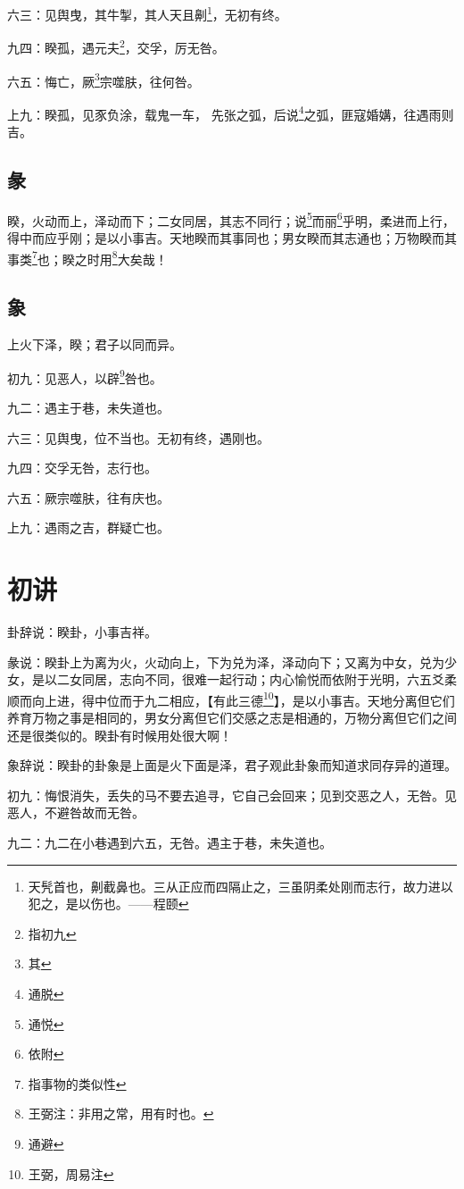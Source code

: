 \documentclass[12pt,oneside]{book}
\begin{document}
六三：见舆曳，其牛掣，其人天且劓\footnote{天髠首也，劓截鼻也。三从正应而四隔止之，三虽阴柔处刚而志行，故力进以犯之，是以伤也。——程颐}，无初有终。

九四：睽孤，遇元夫\footnote{指初九}，交孚，厉无咎。

六五：悔亡，厥\footnote{其}宗噬肤，往何咎。

上九：睽孤，见豕负涂，载鬼一车， 先张之弧，后说\footnote{通脱}之弧，匪寇婚媾，往遇雨则吉。

\subsection{彖}
睽，火动而上，泽动而下；二女同居，其志不同行；说\footnote{通悦}而丽\footnote{依附}乎明，柔进而上行，得中而应乎刚；是以小事吉。天地睽而其事同也；男女睽而其志通也；万物睽而其事类\footnote{指事物的类似性}也；睽之时用\footnote{王弼注：非用之常，用有时也。}大矣哉！

\subsection{象}
上火下泽，睽；君子以同而异。

初九：见恶人，以辟\footnote{通避}咎也。

九二：遇主于巷，未失道也。

六三：见舆曳，位不当也。无初有终，遇刚也。

九四：交孚无咎，志行也。

六五：厥宗噬肤，往有庆也。

上九：遇雨之吉，群疑亡也。

\section{初讲}
卦辞说：睽卦，小事吉祥。

彖说：睽卦上为离为火，火动向上，下为兑为泽，泽动向下；又离为中女，兑为少女，是以二女同居，志向不同，很难一起行动；内心愉悦而依附于光明，六五爻柔顺而向上进，得中位而于九二相应，【有此三德\footnote{王弼，周易注}】，是以小事吉。天地分离但它们养育万物之事是相同的，男女分离但它们交感之志是相通的，万物分离但它们之间还是很类似的。睽卦有时候用处很大啊！

象辞说：睽卦的卦象是上面是火下面是泽，君子观此卦象而知道求同存异的道理。


初九：悔恨消失，丢失的马不要去追寻，它自己会回来；见到交恶之人，无咎。见恶人，不避咎故而无咎。

九二：九二在小巷遇到六五，无咎。遇主于巷，未失道也。
\end{document}
